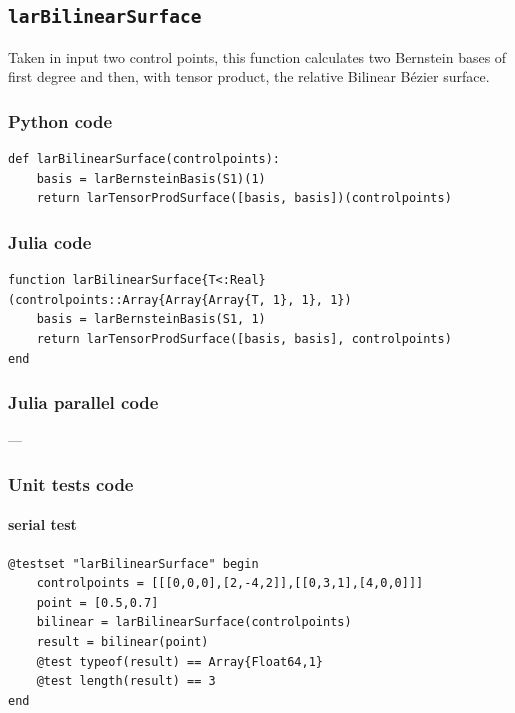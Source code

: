 \documentclass[a4paper,11pt]{article}
\begin{document}
\subsection{\texttt{larBilinearSurface}}

Taken in input two control points, this function calculates two Bernstein bases of first degree and then, with tensor product, the relative Bilinear B\'ezier surface.

\subsubsection{Python code}

\begin{verbatim}
def larBilinearSurface(controlpoints):
    basis = larBernsteinBasis(S1)(1)
    return larTensorProdSurface([basis, basis])(controlpoints)
\end{verbatim}

\subsubsection{Julia code}

\begin{verbatim}
function larBilinearSurface{T<:Real}(controlpoints::Array{Array{Array{T, 1}, 1}, 1})
    basis = larBernsteinBasis(S1, 1)
    return larTensorProdSurface([basis, basis], controlpoints)
end
\end{verbatim}

\subsubsection{Julia parallel code}
---

\subsubsection{Unit tests code}

\paragraph{serial test}
\begin{verbatim}
@testset "larBilinearSurface" begin
    controlpoints = [[[0,0,0],[2,-4,2]],[[0,3,1],[4,0,0]]]
    point = [0.5,0.7]
    bilinear = larBilinearSurface(controlpoints)
    result = bilinear(point)
    @test typeof(result) == Array{Float64,1}
    @test length(result) == 3
end
\end{verbatim}
\end{document}
